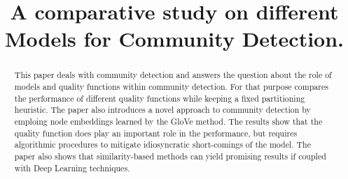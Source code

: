 \documentclass[11pt, twocolumn]{article}
\begin{document}
\title{A comparative study on different Models for Community Detection.}

\maketitle
\begin{abstract} 
This paper deals with community detection and answers the question about the role of models and quality functions within community detection. For that purpose compares the performance of different quality functions while keeping a fixed partitioning heuristic. The paper also introduces a novel approach to community detection by emploing node embeddings learned by the GloVe method. The results show that the quality function does play an important role in the performance, but requires algorithmic procedures to mitigate idiosyncratic short-comings of the model. The paper also shows that similarity-based methods can yield promising results if coupled with Deep Learning techniques. 
\end{abstract}

\end{document}
